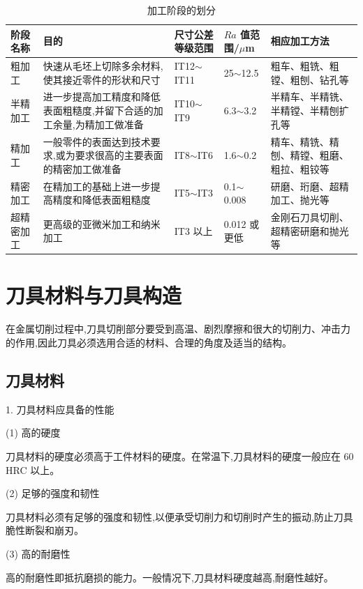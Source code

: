 \documentclass[UTF8]{ctexbook}
\newcommand{\◎}{\ensuremath{\bigcirc}}
\begin{document}
\begin{table}[H]
\centering
\caption{加工阶段的划分}
\label{tab:13-1}
\small
\begin{tabular}{|p{1.5cm}|p{4cm}|p{2.5cm}|p{2.5cm}|p{3cm}|}
\hline
阶段名称 & 目的 & 尺寸公差等级范围 & $Ra$ 值范围/$\mu$m & 相应加工方法 \\
\hline
粗加工 & 快速从毛坯上切除多余材料,使其接近零件的形状和尺寸 & IT12$\sim$IT11 & 25$\sim$12.5 & 粗车、粗铣、粗镗、粗刨、钻孔等 \\
\hline
半精加工 & 进一步提高加工精度和降低表面粗糙度,并留下合适的加工余量,为精加工做准备 & IT10$\sim$IT9 & 6.3$\sim$3.2 & 半精车、半精铣、半精镗、半精刨扩孔等 \\
\hline
精加工 & 一般零件的表面达到技术要求,或为要求很高的主要表面的精密加工做准备 & IT8$\sim$IT6 & 1.6$\sim$0.2 & 精车、精铣、精刨、精镗、粗磨、粗拉、粗铰等 \\
\hline
精密加工 & 在精加工的基础上进一步提高精度和降低表面粗糙度 & IT5$\sim$IT3 & 0.1$\sim$0.008 & 研磨、珩磨、超精加工、抛光等 \\
\hline
超精密加工 & 更高级的亚微米加工和纳米加工 & IT3 以上 & 0.012 或更低 & 金刚石刀具切削、超精密研磨和抛光等 \\
\hline
\end{tabular}\end{table}

\section{刀具材料与刀具构造}

在金属切削过程中,刀具切削部分要受到高温、剧烈摩擦和很大的切削力、冲击力的作用,因此刀具必须选用合适的材料、合理的角度及适当的结构。

\subsection{刀具材料}

1. 刀具材料应具备的性能

(1) 高的硬度

刀具材料的硬度必须高于工件材料的硬度。在常温下,刀具材料的硬度一般应在 60 HRC 以上。

(2) 足够的强度和韧性

刀具材料必须有足够的强度和韧性,以便承受切削力和切削时产生的振动,防止刀具脆性断裂和崩刃。

(3) 高的耐磨性

高的耐磨性即抵抗磨损的能力。一般情况下,刀具材料硬度越高,耐磨性越好。
\end{document}
